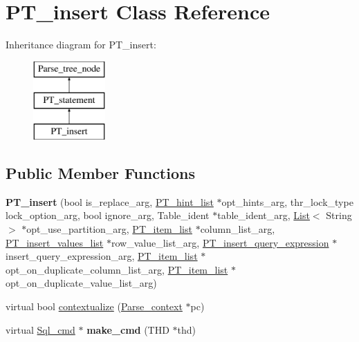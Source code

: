 \hypertarget{classPT__insert}{}\section{P\+T\+\_\+insert Class Reference}
\label{classPT__insert}
Inheritance diagram for P\+T\+\_\+insert\+:\begin{figure}[H]
\begin{center}
\leavevmode
\includegraphics[height=3.000000cm]{classPT__insert}
\end{center}
\end{figure}
\subsection*{Public Member Functions}
\begin{DoxyCompactItemize}
\item 
\mbox{\label{classPT__insert_ae3b31cb9445109871b1301ceacecf83d}} 
{\bfseries P\+T\+\_\+insert} (bool is\+\_\+replace\+\_\+arg, \mbox{\hyperlink{classPT__hint__list}{P\+T\+\_\+hint\+\_\+list}} $\ast$opt\+\_\+hints\+\_\+arg, thr\+\_\+lock\+\_\+type lock\+\_\+option\+\_\+arg, bool ignore\+\_\+arg, Table\+\_\+ident $\ast$table\+\_\+ident\+\_\+arg, \mbox{\hyperlink{classList}{List}}$<$ String $>$ $\ast$opt\+\_\+use\+\_\+partition\+\_\+arg, \mbox{\hyperlink{classPT__item__list}{P\+T\+\_\+item\+\_\+list}} $\ast$column\+\_\+list\+\_\+arg, \mbox{\hyperlink{classPT__insert__values__list}{P\+T\+\_\+insert\+\_\+values\+\_\+list}} $\ast$row\+\_\+value\+\_\+list\+\_\+arg, \mbox{\hyperlink{classPT__insert__query__expression}{P\+T\+\_\+insert\+\_\+query\+\_\+expression}} $\ast$insert\+\_\+query\+\_\+expression\+\_\+arg, \mbox{\hyperlink{classPT__item__list}{P\+T\+\_\+item\+\_\+list}} $\ast$opt\+\_\+on\+\_\+duplicate\+\_\+column\+\_\+list\+\_\+arg, \mbox{\hyperlink{classPT__item__list}{P\+T\+\_\+item\+\_\+list}} $\ast$opt\+\_\+on\+\_\+duplicate\+\_\+value\+\_\+list\+\_\+arg)
\item 
virtual bool \mbox{\hyperlink{classPT__insert_abac83e416618613080e64190c331ccc9}{contextualize}} (\mbox{\hyperlink{structParse__context}{Parse\+\_\+context}} $\ast$pc)
\item 
\mbox{\label{classPT__insert_ad9cb8c22dcd3f75dd18a56bf9690dade}} 
virtual \mbox{\hyperlink{classSql__cmd}{Sql\+\_\+cmd}} $\ast$ {\bfseries make\+\_\+cmd} (T\+HD $\ast$thd)
\end{DoxyCompactItemize}
